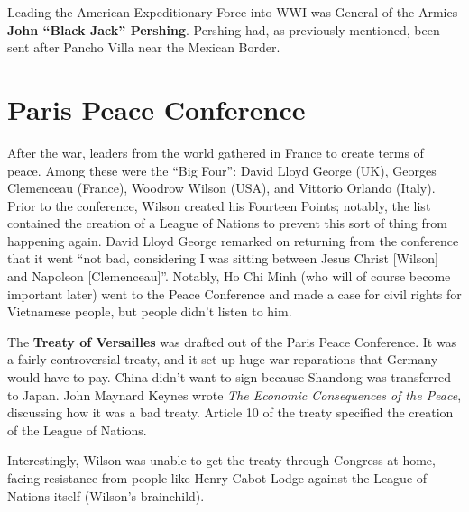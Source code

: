 Leading the American Expeditionary Force into WWI was General of the Armies \textbf{John ``Black Jack'' Pershing}.
Pershing had, as previously mentioned, been sent after Pancho Villa near the Mexican Border.

\section{Paris Peace Conference}

After the war, leaders from the world gathered in France to create terms of peace.
Among these were the ``Big Four'':
David Lloyd George (UK),
Georges Clemenceau (France),
Woodrow Wilson (USA),
and Vittorio Orlando (Italy).
Prior to the conference, Wilson created his Fourteen Points;
notably, the list contained the creation of a League of Nations to prevent this sort of thing from happening again.
David Lloyd George remarked on returning from the conference that it went
``not bad, considering I was sitting between Jesus Christ [Wilson] and Napoleon [Clemenceau]''.
Notably, Ho Chi Minh (who will of course become important later)
went to the Peace Conference and made a case for civil rights for Vietnamese people,
but people didn't listen to him.

The \textbf{Treaty of Versailles} was drafted out of the Paris Peace Conference.
It was a fairly controversial treaty, and it set up huge war reparations that Germany would have to pay.
China didn't want to sign because Shandong was transferred to Japan.
John Maynard Keynes wrote \textit{The Economic Consequences of the Peace}, discussing how it was a bad treaty.
Article 10 of the treaty specified the creation of the League of Nations.

Interestingly, Wilson was unable to get the treaty through Congress at home,
facing resistance from people like Henry Cabot Lodge against the League of Nations itself (Wilson's brainchild).
